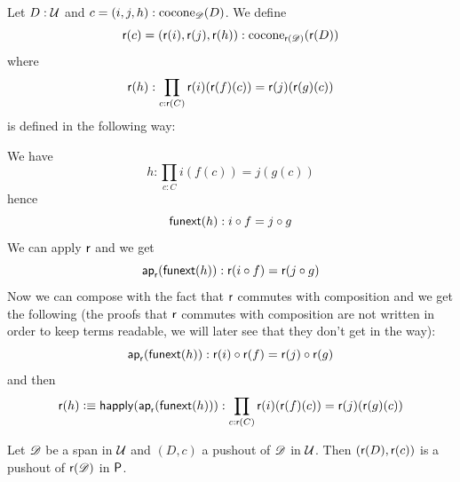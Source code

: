 \begin{defn}
  Let $D:\type$ and $c=(i,j,h):\cocone{\Ddiag}{D}$.
  We define
  \[\reflect(c)=(\reflect(i),\reflect(j),\reflect(h)):
  \cocone{\reflect(\Ddiag)}{\reflect(D)}\]
  where
  \[\reflect(h):\prod_{c:\reflect(C)}\reflect(i)(\reflect(f)(c))=\reflect(j)(\reflect(g)(c))\]
  is defined in the following way:

  We have \[h:\prod_{c:C}i(f(c))=j(g(c))\]
  hence
  \[\funext(h):i\circ{}f=j\circ{}g\]
  We can apply $\reflect$ and we get
  \[\mapfunc{\reflect}(\funext(h)):\reflect(i\circ{}f)=\reflect(j\circ{}g)\]
  Now we can compose with the fact that $\reflect$ commutes with composition and
  we get the following (the proofs that $\reflect$ commutes with composition are
  not written in order to keep terms readable, we will later see that they don't
  get in the way):
  \[\mapfunc{\reflect}(\funext(h)):
  \reflect(i)\circ\reflect(f)=\reflect(j)\circ\reflect(g)\]
  and then
  \[\reflect(h)\defeq\happly(\mapfunc{\reflect}(\funext(h))):
  \prod_{c:\reflect(C)}\reflect(i)(\reflect(f)(c))=\reflect(j)(\reflect(g)(c))\]
\end{defn}

\begin{lem}
  \label{reflectcommutespushout}
  Let $\Ddiag$ be a span in $\type$ and $(D,c)$ a pushout of $\Ddiag$
  in $\type$. Then $(\reflect(D),\reflect(c))$ is a pushout of
  $\reflect(\Ddiag)$ in $\P$.
\end{lem}

